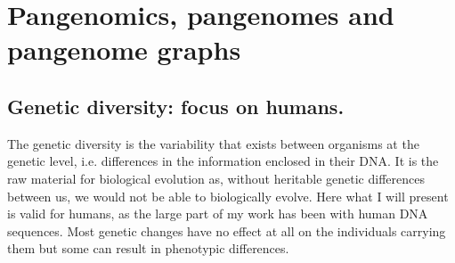 \clearpage
\section{Pangenomics, pangenomes and pangenome graphs}
\label{sec:background:pangenomics}
\subsection{Genetic diversity: focus on humans.}
The genetic diversity is the variability that exists between organisms at the genetic level, i.e. differences in the information enclosed in their DNA. It is the raw material for biological evolution as, without heritable genetic differences between us, we would not be able to biologically evolve. Here what I will present is valid for humans, as the large part of my work has been with human DNA sequences. Most genetic changes have no effect at all on the individuals carrying them but some can result in phenotypic differences.\\
